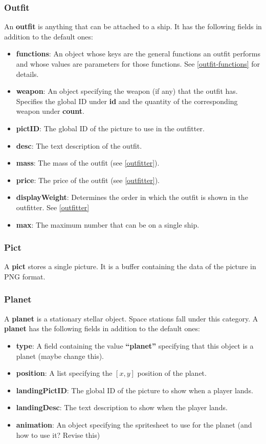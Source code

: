 \documentclass{article}
\begin{document}
\subsubsection{Outfit}
An \textbf{outfit} is anything that can be attached to a ship. It has the following fields in addition to the default ones:
\begin{itemize}
\item{\textbf{functions}}: An object whose keys are the general functions an outfit performs and whose values are parameters for those functions. See \ref{outfit-functions} for details.
\item{\textbf{weapon}}: An object specifying the weapon (if any) that the outfit has. Specifies the global ID under \textbf{id} and the quantity of the corresponding weapon under \textbf{count}.
\item{\textbf{pictID}}: The global ID of the picture to use in the outfitter.
\item{\textbf{desc}}: The text description of the outfit.
\item{\textbf{mass}}: The mass of the outfit (see \ref{outfitter}).
\item{\textbf{price}}: The price of the outfit (see \ref{outfitter}).
\item{\textbf{displayWeight}}: Determines the order in which the outfit is shown in the outfitter. See \ref{outfitter}
\item{\textbf{max}}: The maximum number that can be on a single ship.
\end{itemize}

\subsubsection{Pict}
A \textbf{pict} stores a single picture. It is a buffer containing the data of the picture in PNG format.

\subsubsection{Planet}
A \textbf{planet} is a stationary stellar object. Space stations fall under this category. A \textbf{planet} has the following fields in addition to the default ones:
\begin{itemize}
\item{\textbf{type}}: A field containing the value \textbf{``planet''} specifying that this object is a planet (maybe change this).
\item{\textbf{position}}: A list specifying the $[x,y]$ position of the planet.
\item{\textbf{landingPictID}}: The global ID of the picture to show when a player lands.
\item{\textbf{landingDesc}}: The text description to show when the player lands.
\item{\textbf{animation}}: An object specifying the spritesheet to use for the planet (and how to use it? Revise this)
\end{itemize}
\end{document}
